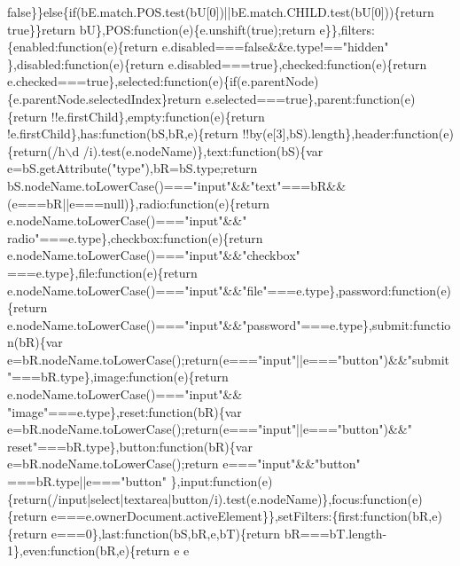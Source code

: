 \begin{DoxyCode}
{       false\}\}else\{if(bE.match.POS.test(bU[0])||bE.match.CHILD.test(bU[0]))\{return true\}\}return
       bU\},POS:function(e)\{e.unshift(true);return e\}\},filters:\{enabled:function(e)\{return e.disabled===false&&e.type!=="}hidden\textcolor{stringliteral}{"
      \},disabled:function(e)\{return e.disabled===true\},checked:function(e)\{return
       e.checked===true\},selected:function(e)\{if(e.parentNode)\{e.parentNode.selectedIndex\}return e.selected===true\},parent:function(e)\{return
       !!e.firstChild\},empty:function(e)\{return !e.firstChild\},has:function(bS,bR,e)\{return !!by(e[3],bS).length\},header:function(e)\{return(/h\(\backslash\)d
      /i).test(e.nodeName)\},text:function(bS)\{var e=bS.getAttribute("}type\textcolor{stringliteral}{"),bR=bS.type;return
       bS.nodeName.toLowerCase()==="}input\textcolor{stringliteral}{"&&"}text\textcolor{stringliteral}{"===bR&&(e===bR||e===null)\},radio:function(e)\{return e.nodeName.toLowerCase()==="}input\textcolor{stringliteral}{"&&"}
      radio\textcolor{stringliteral}{"===e.type\},checkbox:function(e)\{return e.nodeName.toLowerCase()==="}input\textcolor{stringliteral}{"&&"}checkbox\textcolor{stringliteral}{"
      ===e.type\},file:function(e)\{return e.nodeName.toLowerCase()==="}input\textcolor{stringliteral}{"&&"}file\textcolor{stringliteral}{"===e.type\},password:function(e)\{return
       e.nodeName.toLowerCase()==="}input\textcolor{stringliteral}{"&&"}password\textcolor{stringliteral}{"===e.type\},submit:function(bR)\{var
       e=bR.nodeName.toLowerCase();return(e==="}input\textcolor{stringliteral}{"||e==="}button\textcolor{stringliteral}{")&&"}submit\textcolor{stringliteral}{"===bR.type\},image:function(e)\{return e.nodeName.toLowerCase()==="}input\textcolor{stringliteral}{"&&
      "}image\textcolor{stringliteral}{"===e.type\},reset:function(bR)\{var e=bR.nodeName.toLowerCase();return(e==="}input\textcolor{stringliteral}{"||e==="}button\textcolor{stringliteral}{")&&"}
      reset\textcolor{stringliteral}{"===bR.type\},button:function(bR)\{var e=bR.nodeName.toLowerCase();return e==="}input\textcolor{stringliteral}{"&&"}button\textcolor{stringliteral}{"
      ===bR.type||e==="}button\textcolor{stringliteral}{"
      \},input:function(e)\{return(/input|select|textarea|button/i).test(e.nodeName)\},focus:function(e)\{return e===e.ownerDocument.activeElement\}\},setFilters:\{first:function(bR,e)\{return
       e===0\},last:function(bS,bR,e,bT)\{return bR===bT.length-1\},even:function(bR,e)\{return e%
       e%
}
\end{DoxyCode}
